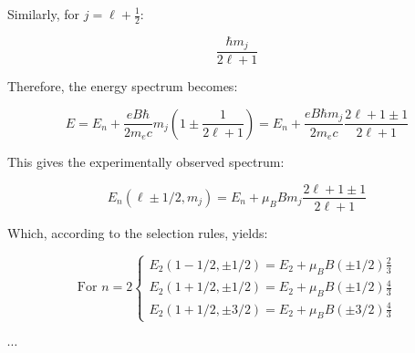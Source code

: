 Similarly, for $j=\ell+\frac{1}{2}$:

\begin{equation}
\frac{\hbar m_j}{2\ell+1}
\end{equation}

Therefore, the energy spectrum becomes:

\begin{equation}
E=E_n+\frac{eB\hbar}{2m_e c}m_j\left(1\pm\frac{1}{2\ell+1}\right)=E_n+\frac{eB\hbar m_j}{2m_e c}\frac{2\ell+1\pm 1}{2\ell+1}
\end{equation}

This gives the experimentally observed spectrum:

\begin{equation}
E_n(\ell\pm 1/2,m_j)=E_n+\mu_B Bm_j\frac{2\ell+1\pm 1}{2\ell+1}
\end{equation}

Which, according to the selection rules, yields:

\[
\text{For } n=2\left\{\begin{array}{l}
E_2(1-1/2,\pm 1/2)=E_2+\mu_B B(\pm 1/2)\frac{2}{3} \\
E_2(1+1/2,\pm 1/2)=E_2+\mu_B B(\pm 1/2)\frac{4}{3}\\
E_2(1+1/2,\pm 3/2)=E_2+\mu_B B(\pm 3/2)\frac{4}{3}
\end{array}\right.
\]

$\cdots$
